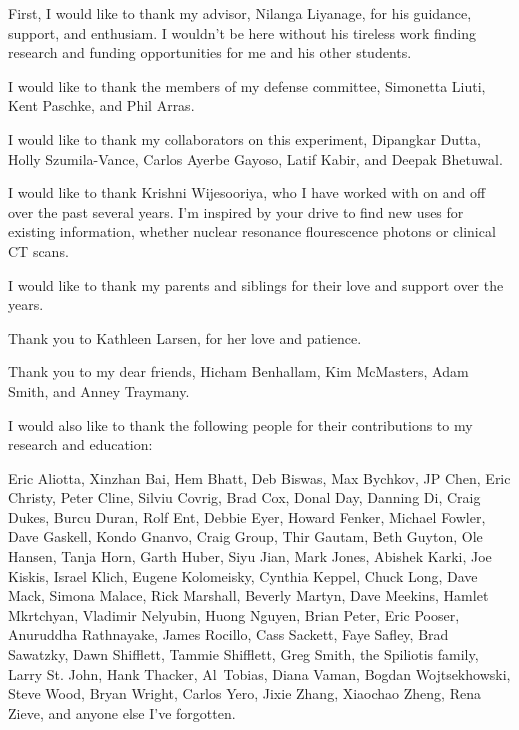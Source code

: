 First, I would like to thank my advisor, Nilanga Liyanage, for his guidance,
support, and enthusiam.
I wouldn't be here without his tireless work finding research and funding
opportunities for me and his other students.

I would like to thank the members of my defense committee, Simonetta
Liuti, Kent Paschke, and Phil Arras.

I would like to thank my collaborators on this experiment, Dipangkar Dutta,
Holly Szumila-Vance, Carlos Ayerbe Gayoso, Latif Kabir, and Deepak
Bhetuwal.

I would like to thank Krishni Wijesooriya, who I have worked with on and off
over the past several years.
I'm inspired by your drive to find new uses for existing information,
whether nuclear resonance flourescence photons or clinical CT scans.

I would like to thank my parents and siblings for their love and
support over the years.

Thank you to Kathleen Larsen, for her love and patience.

Thank you to my dear friends,
Hicham Benhallam,
Kim McMasters,
Adam Smith,
and
Anney Traymany.

I would also like to thank the following people for
their contributions to my research and education:

Eric Aliotta,
Xinzhan Bai,
Hem Bhatt,
Deb Biswas,
Max Bychkov,
JP Chen,
Eric Christy,
Peter Cline,
Silviu Covrig,
Brad Cox,
Donal Day,
Danning Di,
Craig Dukes,
Burcu Duran,
Rolf Ent,
Debbie Eyer,
Howard Fenker,
Michael Fowler,
Dave Gaskell,
Kondo Gnanvo,
Craig Group,
Thir Gautam,
Beth Guyton,
Ole Hansen,
Tanja Horn,
Garth Huber,
Siyu Jian,
Mark Jones,
Abishek Karki,
Joe Kiskis,
Israel Klich,
Eugene Kolomeisky,
Cynthia Keppel,
Chuck Long,
Dave Mack,
Simona Malace,
Rick Marshall,
Beverly Martyn,
Dave Meekins,
Hamlet Mkrtchyan,
Vladimir Nelyubin,
Huong Nguyen,
Brian Peter,
Eric Pooser,
Anuruddha Rathnayake,
James Rocillo,
Cass Sackett,
Faye Safley,
Brad Sawatzky,
Dawn Shifflett,
Tammie Shifflett,
Greg Smith,
the Spiliotis family,
Larry St. John,
Hank Thacker,
Al Tobias,
Diana Vaman,
Bogdan Wojtsekhowski,
Steve Wood,
Bryan Wright,
Carlos Yero,
Jixie Zhang,
Xiaochao Zheng,
Rena Zieve,
and anyone else I’ve forgotten.

